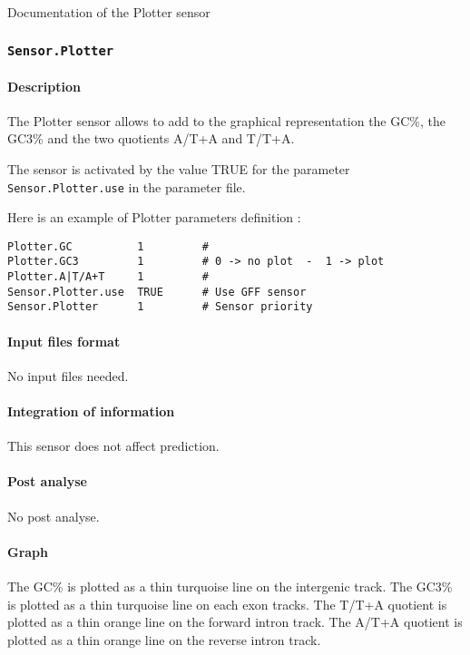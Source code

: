  Documentation of the Plotter sensor

\subsubsection{\texttt{Sensor.Plotter}}

\paragraph{Description}

The Plotter sensor allows to add to the graphical representation the GC\%,
the GC3\% and the two quotients A/T+A and T/T+A.

The sensor is activated by the value TRUE for the parameter
\texttt{Sensor.Plotter.use} in the parameter file.

Here is an example of Plotter parameters definition :
\begin{Verbatim}[fontsize=\small]
Plotter.GC          1         #
Plotter.GC3         1         # 0 -> no plot  -  1 -> plot
Plotter.A|T/A+T     1         #
Sensor.Plotter.use  TRUE      # Use GFF sensor
Sensor.Plotter      1         # Sensor priority
\end{Verbatim}

\paragraph{Input files format}

No input files  needed.

\paragraph{Integration of information}

This sensor does not affect prediction.

\paragraph{Post analyse}

No post analyse.

\paragraph{Graph}

The GC\% is plotted as a thin turquoise line on the intergenic track.
The GC3\% is plotted as a thin turquoise line on each exon tracks.
The T/T+A quotient is plotted as a thin orange line on the forward intron
track.
The A/T+A quotient is plotted as a thin orange line on the reverse intron
track.
